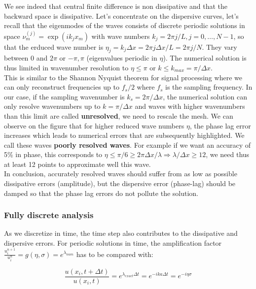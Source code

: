 We see indeed that central finite difference is non dissipative and that the backward space is dissipative. Let's concentrate on the dispersive curves, let's recall that the eigenmodes of the waves consists of discrete periodic solutions in space $\nu ^{(j)}_m = \exp (ik_j x_m)$ with wave numbers $k_j = 2\pi j/L, j= 0, \dots, N-1$, so that the erduced wave number is $\eta _j = k_j \Delta x =  2\pi j \Delta x / L = 2\pi j / N$. They vary between 0 and $2 \pi$ or $-\pi, \pi$ (eigenvalues periodic in $\eta$). The numerical solution is thus limited in wavenumber resolution to $\eta \leq \pi$ or $k \leq k_{max} = \pi / \Delta x$.\\

This is similar to the Shannon Nyquist theorem for signal processing where we can only reconstruct frequencies up to $f_s /2$ where $f_s$ is the sampling frequency. In our case, if the sampling wavenumber is $k_s = 2\pi / \Delta x$, the numerical solution can only resolve wavenumbers up to $k = \pi / \Delta x$ and waves with higher wavenumbers than this limit are called \textbf{unresolved}, we need to rescale the mesh. We can observe on the figure that for higher reduced wave numbers $\eta$, the phase lag error increases which leads to numerical errors that are subsequently highlighted. We call these waves \textbf{poorly resolved waves}. For example if we want an accuracy of 5\% in phase, this corresponds to $\eta \leq \pi / 6 \geq 2\pi \Delta x / \lambda \Rightarrow \lambda / \Delta x \geq 12$, we need thus at least 12 points to approximate well this wave. \\

In conclusion, accurately resolved waves should suffer from as low as possible dissipative errors (amplitude), but the dispersive error (phase-lag) should be damped so that the phase lag errors do not pollute the solution. 

\subsubsection{Fully discrete analysis}
As we discretize in time, the time step also contributes to the dissipative and dispersive errors. For periodic solutions in time, the amplification factor $\frac{u^{n+1}_i}{u_i^n}= g(\eta, \sigma) = e^{\lambda _{num}}$ has to be compared with: 

\begin{equation}
\frac{u(x_i , t + \Delta t)}{u (x_i, t)} = e^{\lambda _{exact}\Delta t} = e^{-i k a \Delta t} = e^{- i \eta \sigma}
\end{equation}  

